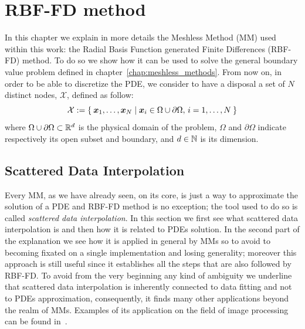 \chapter{RBF-FD method}


In this chapter we explain in more details the Meshless Method (MM) used within this work: the Radial Basis Function generated Finite Differences (RBF-FD) method.
To do so we show how it can be used to solve the general boundary value problem defined in chapter~\vref{chap:meshless_methods}.
From now on, in order to be able to discretize the PDE, we consider to have a disposal a set of $N$ distinct nodes, $\mathcal{X}$, defined as follow:
\begin{equation}
\label{eqn:generic_set_of_nodes_X}
	\mathcal{X} := \Set{\boldsymbol{x}_1, \dots, \boldsymbol{x}_N \mid \boldsymbol{x}_i \in \Omega\cup\partial\Omega, \, i=1, \dots, N}
\end{equation}
where $\Omega\cup\partial\Omega \subset \mathbb{R}^d$ is the physical domain of the problem, $\Omega$ and $\partial\Omega$ indicate respectively its open subset and boundary, and $d \in \mathbb{N}$ is its dimension.




\section{Scattered Data Interpolation}
\label{sec:scattered_data_interpolation}

Every MM, as we have already seen, on its core, is just a way to approximate the solution of a PDE and RBF-FD method is no exception; the tool used to do so is called \emph{scattered data interpolation}. In this section we first see what scattered data interpolation is and then how it is related to PDEs solution. In the second part of the explanation we see how it is applied in general by MMs so to avoid to becoming fixated on a single implementation and losing generality; moreover this approach is still useful since it establishes all the steps that are also followed by RBF-FD.
To avoid from the very beginning any kind of ambiguity we underline that scattered data interpolation is inherently connected to data fitting and not to PDEs approximation, consequently, it finds many other applications beyond the realm of MMs. Examples of its application on the field of image processing can be found in~\cite{Amidror:scattered_data_interpolation_in_image_processing}.


